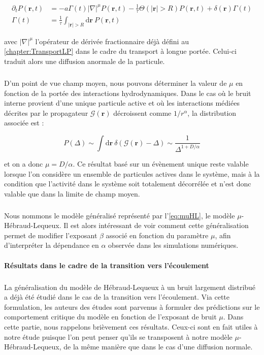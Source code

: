 \begin{equation}
\begin{aligned}
    \partial_t P(\mathbf{r}, t) &= -a\Gamma (t)|\nabla|^{\mu} P(\mathbf{r}, t) - \frac{1}{\tau}\Theta(|\mathbf{r}|>R)P(\mathbf{r}, t) + \delta(\mathbf{r})\Gamma (t)\\
     \Gamma (t) &= \frac{1}{\tau}\int_{|\mathbf{r}|>R}\mathrm{d}\mathbf{r}~P(\mathbf{r}, t)
\end{aligned}
    \label{eq:muHL}
\end{equation}

\noindent avec $|\nabla|^{\mu}$ l'opérateur de dérivée fractionnaire déjà défini au \autoref{chapter:TransportLP} dans le cadre du transport à longue portée. Celui-ci traduit alors une diffusion anormale de la particule.

\subparagraph{}D'un point de vue champ moyen, nous pouvons déterminer la valeur de $\mu$ en fonction de la portée des interactions hydrodynamiques. Dans le cas où le bruit interne provient d'une unique particule active et où les interactions médiées décrites par le propagateur $\mathcal{G}(\mathbf{r})$ décroissent comme $1/r^\alpha$, la distribution associée est :

\begin{equation}
	P(\Delta) \sim \int \mathrm{d}\mathbf{r}~\delta\left( \mathcal{G}(\mathbf{r})-\Delta \right)\sim \frac{1}{\Delta^{1+D/\alpha}}
\end{equation}

\noindent et on a donc $\mu = D/\alpha$. Ce résultat basé sur un évènement unique reste valable lorsque l'on considère un ensemble de particules actives dans le système, mais à la condition que l'activité dans le système soit totalement décorrélée et n'est donc valable que dans la limite de champ moyen.

\subparagraph{}Nous nommons le modèle généralisé représenté par l'\autoref{eq:muHL}, le modèle $\mu$-Hébraud-Lequeux. Il est alors intéressant de voir comment cette généralisation permet de modifier l'exposant $\beta$ associé en fonction du paramètre $\mu$, afin d'interpréter la dépendance en $\alpha$ observée dans les simulations numériques.

\paragraph{Résultats dans le cadre de la transition vers l'écoulement}

\subparagraph{}La généralisation du modèle de Hébraud-Lequeux à un bruit largement distribué a déjà été étudié dans le cas de la transition vers l'écoulement. Via cette formulation, les auteurs des études \cite{lin_mean-field_2016, lin_microscopic_2018} sont parvenus à formuler des prédictions sur le comportement critique du modèle en fonction de l'exposant de bruit $\mu$. Dans cette partie, nous rappelons brièvement ces résultats. Ceux-ci sont en fait utiles à notre étude puisque l'on peut penser qu'ils se transposent à notre modèle $\mu$-Hébraud-Lequeux, de la même manière que dans le cas d'une diffusion normale.

